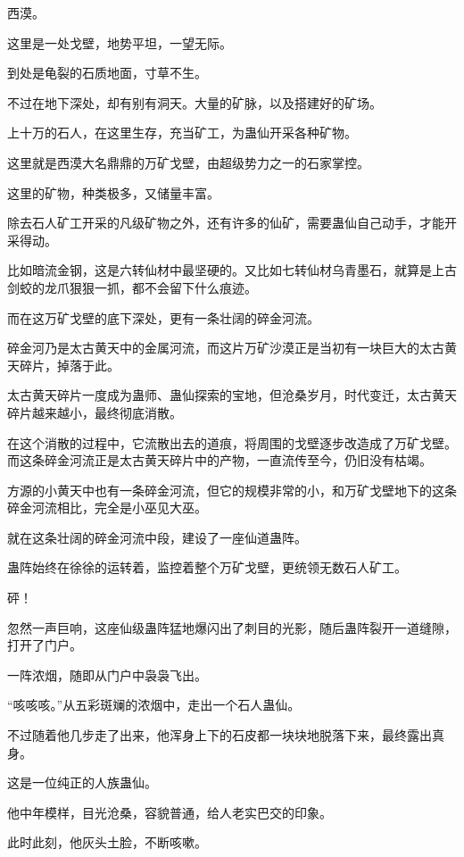 
\begin{this_body}

西漠。

这里是一处戈壁，地势平坦，一望无际。

到处是龟裂的石质地面，寸草不生。

不过在地下深处，却有别有洞天。大量的矿脉，以及搭建好的矿场。

上十万的石人，在这里生存，充当矿工，为蛊仙开采各种矿物。

这里就是西漠大名鼎鼎的万矿戈壁，由超级势力之一的石家掌控。

这里的矿物，种类极多，又储量丰富。

除去石人矿工开采的凡级矿物之外，还有许多的仙矿，需要蛊仙自己动手，才能开采得动。

比如暗流金钢，这是六转仙材中最坚硬的。又比如七转仙材乌青墨石，就算是上古剑蛟的龙爪狠狠一抓，都不会留下什么痕迹。

而在这万矿戈壁的底下深处，更有一条壮阔的碎金河流。

碎金河乃是太古黄天中的金属河流，而这片万矿沙漠正是当初有一块巨大的太古黄天碎片，掉落于此。

太古黄天碎片一度成为蛊师、蛊仙探索的宝地，但沧桑岁月，时代变迁，太古黄天碎片越来越小，最终彻底消散。

在这个消散的过程中，它流散出去的道痕，将周围的戈壁逐步改造成了万矿戈壁。而这条碎金河流正是太古黄天碎片中的产物，一直流传至今，仍旧没有枯竭。

方源的小黄天中也有一条碎金河流，但它的规模非常的小，和万矿戈壁地下的这条碎金河流相比，完全是小巫见大巫。

就在这条壮阔的碎金河流中段，建设了一座仙道蛊阵。

蛊阵始终在徐徐的运转着，监控着整个万矿戈壁，更统领无数石人矿工。

砰！

忽然一声巨响，这座仙级蛊阵猛地爆闪出了刺目的光影，随后蛊阵裂开一道缝隙，打开了门户。

一阵浓烟，随即从门户中袅袅飞出。

“咳咳咳。”从五彩斑斓的浓烟中，走出一个石人蛊仙。

不过随着他几步走了出来，他浑身上下的石皮都一块块地脱落下来，最终露出真身。

这是一位纯正的人族蛊仙。

他中年模样，目光沧桑，容貌普通，给人老实巴交的印象。

此时此刻，他灰头土脸，不断咳嗽。


\end{this_body}

